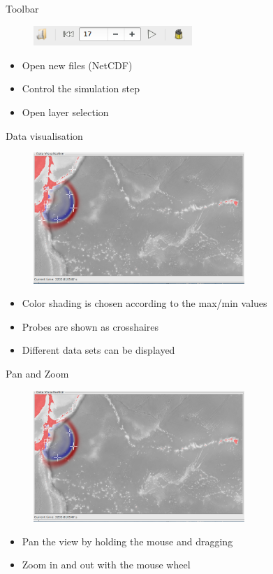 \documentclass[shortpres,usenames,dvipsnames]{beamer}
\begin{document}
\begin{frame}[fragile]{Toolbar}
	\begin{figure}
		\includegraphics[clip, width=60mm]{img/toolbar.png}
	\end{figure}
	\begin{itemize}
		\item Open new files (NetCDF)
		\item Control the simulation step
		\item Open layer selection
	\end{itemize}
\end{frame}

\begin{frame}[fragile]{Data visualisation}
	\begin{figure}
		\includegraphics[clip, width=80mm]{img/datavis.png}
	\end{figure}
	\begin{itemize}
		\item Color shading is chosen according to the max/min values
		\item Probes are shown as crosshaires
		\item Different data sets can be displayed
	\end{itemize}
\end{frame}

\begin{frame}[fragile]{Pan and Zoom}
	\begin{figure}
		\includegraphics[clip, width=80mm]{img/datavis.png}
	\end{figure}
	\begin{itemize}
		\item Pan the view by holding the mouse and dragging
		\item Zoom in and out with the mouse wheel
	\end{itemize}
\end{frame}
\end{document}
